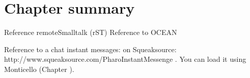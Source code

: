 \documentclass[a4paper,10pt,twoside]{book}
\begin{document}
%
%
%
%
%
%
%
%
%
%
%
%
%
%
%
%

\section{Chapter summary}
Reference remoteSmalltalk (rST)
Reference to OCEAN

Reference to a chat instant messages:  on Squeaksource: http://www.squeaksource.com/PharoInstantMessenge . You can load it using Monticello (Chapter ).

\ifx\wholebook\relax\else
\end{document}
